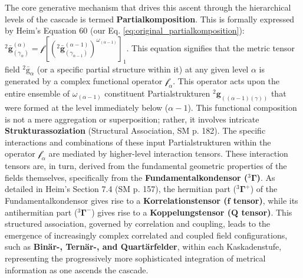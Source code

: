\documentclass[12pt]{article}
\newcommand{\kompositionsfeld}{{}^2\bar{\mathrm{g}}}
\newcommand{\partialstruktur}[1]{{}^2\mathbf{g}_{(#1)}}
\newcommand{\fundamentalkondensor}{{}^3\bm{\Gamma}}
\newcommand{\korrelationstensor}{\mathbf{f}}
\newcommand{\koppelungstensor}{\mathbf{Q}}
\begin{document}
The core generative mechanism that drives this ascent through the hierarchical levels of the cascade is termed \textbf{Partialkomposition}. This is formally expressed by Heim's Equation 60 (our Eq. \eqref{eq:original_partialkomposition}): \( {}^{2}\bar{\mathbf{g}}^{(\alpha)}_{(\gamma_{\alpha})} = \mathcal{f} \left[ ({}^{2}\bar{\mathbf{g}}^{(\alpha-1)}_{(\gamma_{\alpha-1})})^{\omega_{(\alpha-1)}} \right]_1 \). This equation signifies that the metric tensor field \( \kompositionsfeld_\alpha \) (or a specific partial structure within it) at any given level \( \alpha \) is generated by a complex functional operator \( \mathcal{f}_\alpha \). This operator acts upon the entire ensemble of \( \omega_{(\alpha-1)} \) constituent Partialstrukturen \( \partialstruktur{(\alpha-1)(\gamma)} \) that were formed at the level immediately below (\( \alpha-1 \)). This functional composition is not a mere aggregation or superposition; rather, it involves intricate \textbf{Strukturassoziation} (Structural Association, SM p. 182). The specific interactions and combinations of these input Partialstrukturen within the operator \( \mathcal{f}_\alpha \) are mediated by higher-level interaction tensors. These interaction tensors are, in turn, derived from the fundamental geometric properties of the fields themselves, specifically from the \textbf{Fundamentalkondensor (\( \fundamentalkondensor \))}. As detailed in Heim's Section 7.4 (SM p. 157), the hermitian part (\( \fundamentalkondensor^+ \)) of the Fundamentalkondensor gives rise to a \textbf{Korrelationstensor (\( \korrelationstensor \) tensor)}, while its antihermitian part (\( \fundamentalkondensor^- \)) gives rise to a \textbf{Koppelungstensor (\( \koppelungstensor \) tensor)}. This structured association, governed by correlation and coupling, leads to the emergence of increasingly complex correlated and coupled field configurations, such as \textbf{Binär-, Ternär-, and Quartärfelder}, within each Kaskadenstufe, representing the progressively more sophisticated integration of metrical information as one ascends the cascade.
\end{document}
